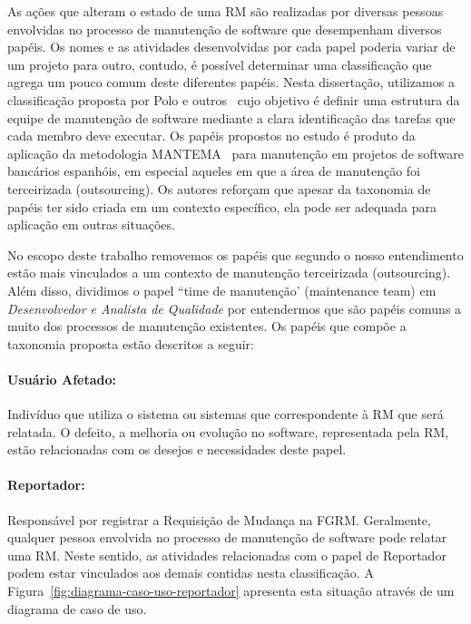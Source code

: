 As ações que alteram o estado de uma RM são realizadas por diversas pessoas
envolvidas no processo de manutenção de software que desempenham diversos
papéis. Os nomes e as atividades desenvolvidas por cada papel poderia variar de
um projeto para outro, contudo, é possível determinar uma classificação que
agrega um pouco comum deste diferentes papéis. Nesta dissertação, utilizamos a
classificação proposta por Polo e outros~\cite{Polo1999} cujo objetivo é definir
uma estrutura da equipe de manutenção de software mediante a clara identificação
das tarefas que cada membro deve executar. Os papéis propostos no estudo é
produto da aplicação da metodologia MANTEMA~\cite{756695} para manutenção em
projetos de software bancários espanhóis, em especial aqueles em que a área de
manutenção foi terceirizada (outsourcing). Os autores reforçam que apesar da
taxonomia de papéis ter sido criada em um contexto específico, ela pode ser
adequada para aplicação em outras situações.

No escopo deste trabalho removemos os papéis que segundo o nosso entendimento
estão mais vinculados a um contexto de manutenção terceirizada (outsourcing).
Além disso, dividimos o papel ``time de manutenção' (maintenance team) em
\textit{Desenvolvedor e Analista de Qualidade} por entendermos que são papéis
comuns a muito dos processos de manutenção existentes. Os papéis que compõe a
taxonomia proposta estão descritos a seguir:

\paragraph{Usuário Afetado:}
Indivíduo que utiliza o sistema ou sistemas que correspondente à RM que será
relatada. O defeito, a melhoria ou evolução no software, representada pela RM,
estão relacionadas com os desejos e necessidades deste papel.

\paragraph{Reportador:}
Responsável por registrar a Requisição de Mudança na FGRM\@. Geralmente,
qualquer pessoa envolvida no processo de manutenção de software pode relatar uma
RM. Neste sentido, as atividades relacionadas com o papel de Reportador podem
estar vinculados aos demais contidas nesta classificação. A
Figura~\ref{fig:diagrama-caso-uso-reportador} apresenta esta situação através de
um diagrama de caso de uso.


